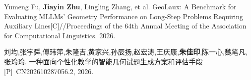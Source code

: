 \begin{achievelist}
    \item Yumeng Fu, \textbf{Jiayin Zhu}, Lingling Zhang, et al. GeoLaux: A Benchmark for Evaluating MLLMs' Geometry Performance on Long-Step Problems Requiring Auxiliary Lines[C]//Proceedings of the 64th Annual Meeting of the Association for Computational Linguistics. 2026.
    \item 刘均,张宇舜,傅玮萍,朱隆吉,黄家兴,孙辰扬,赵宏涛,王庆康,\textbf{朱佳印},陈一心,魏笔凡,张玲玲. 一种面向个性化教学的智能几何试题生成方案和评估手段[P]~CN202610287056.2, 2026.
\end{achievelist}

